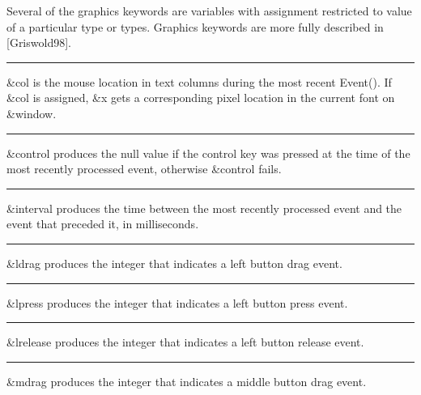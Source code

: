 Several of the graphics keywords are variables with assignment
restricted to value of a particular type or types. Graphics keywords
are more fully described in [Griswold98].

\bigskip\hrule\vspace{0.1cm}

\noindent
\textsf{\&col} is the mouse location in text columns during the most
recent \textsf{Event()}. If \textsf{\&col} is assigned, \textsf{\&x}
gets a corresponding pixel location in the current font on
\textsf{\&window}.

\bigskip\hrule\vspace{0.1cm}

\noindent
\textsf{\&control} produces the null value if the control key was
pressed at the time of the most recently processed event, otherwise
\textsf{\&control} fails.

\bigskip\hrule\vspace{0.1cm}

\noindent
\textsf{\&interval} produces the time between the most recently
processed event and the event that preceded it, in milliseconds.

\bigskip\hrule\vspace{0.1cm}

\noindent
\textsf{\&ldrag} produces the integer that indicates a left button drag
event.

\bigskip\hrule\vspace{0.1cm}

\noindent
\textsf{\&lpress} produces the integer that indicates a left button
press event.

\bigskip\hrule\vspace{0.1cm}

\noindent
\textsf{\&lrelease} produces the integer that indicates a left button
release event.

\bigskip\hrule\vspace{0.1cm}

\noindent
\textsf{\&mdrag} produces the integer that indicates a middle button drag event.

